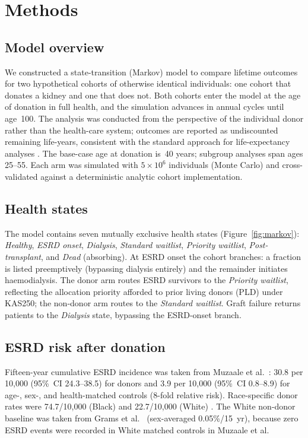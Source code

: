 \section{Methods}
\label{sec:methods}

\subsection{Model overview}

We constructed a state-transition (Markov) model to compare lifetime outcomes
for two hypothetical cohorts of otherwise identical individuals: one cohort that
donates a kidney and one that does not.
Both cohorts enter the model at the age of donation in full health, and the
simulation advances in annual cycles until age~100.
The analysis was conducted from the perspective of the individual donor rather
than the health-care system; outcomes are reported as undiscounted remaining
life-years, consistent with the standard approach for life-expectancy analyses
\cite{gold_cost_1996}.
The base-case age at donation is~40 years; subgroup analyses span ages 25--55.
Each arm was simulated with $5 \times 10^6$ individuals (Monte Carlo) and
cross-validated against a deterministic analytic cohort implementation.

\subsection{Health states}

The model contains seven mutually exclusive health states
(Figure~\ref{fig:markov}):
\textit{Healthy}, \textit{ESRD onset}, \textit{Dialysis},
\textit{Standard waitlist}, \textit{Priority waitlist},
\textit{Post-transplant}, and \textit{Dead} (absorbing).
At ESRD onset the cohort branches: a fraction is listed preemptively
(bypassing dialysis entirely) and the remainder initiates haemodialysis.
The donor arm routes ESRD survivors to the \textit{Priority waitlist},
reflecting the allocation priority afforded to prior living donors (PLD)
under KAS250; the non-donor arm routes to the \textit{Standard waitlist}.
Graft failure returns patients to the \textit{Dialysis} state, bypassing
the ESRD-onset branch.

\subsection{ESRD risk after donation}

Fifteen-year cumulative ESRD incidence was taken from Muzaale et al.\
\cite{muzaale_risk_2014}:
30.8 per 10,000 (95\%~CI 24.3--38.5) for donors and 3.9 per 10,000
(95\%~CI 0.8--8.9) for age-, sex-, and health-matched controls
(8-fold relative risk).
Race-specific donor rates were 74.7/10,000 (Black) and 22.7/10,000
(White) \cite{muzaale_risk_2014}.
The White non-donor baseline was taken from Grams et al.\
\cite{grams_kidney-failure_2016} (sex-averaged 0.05\%/15~yr), because
zero ESRD events were recorded in White matched controls in Muzaale et al.

